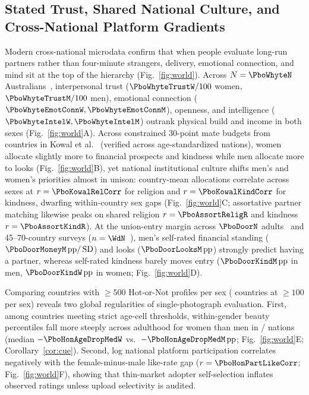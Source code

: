\subsection{Stated Trust, Shared National Culture, and Cross-National Platform Gradients}
Modern cross-national microdata confirm that when people evaluate long-run partners rather than four-minute strangers, delivery, emotional connection, and mind sit at the top of the hierarchy (Fig.~\ref{fig:world}). Across $N=\PboWhyteN$ Australians~\cite{whyte2021}, interpersonal trust ($\PboWhyteTrustW/100$ women, $\PboWhyteTrustM/100$ men), emotional connection ($\PboWhyteEmotConnW,\PboWhyteEmotConnM$), openness, and intelligence ($\PboWhyteIntelW,\PboWhyteIntelM$) outrank physical build and income in both sexes (Fig.~\ref{fig:world}A). Across \PboKowalBudgetN{} constrained 30-point mate budgets from \PboKowalCountryN{} countries in Kowal et al.~\cite{kowal2025} (verified across \PboKowalStdCountryN{} age-standardized nations), women allocate slightly more to financial prospects and kindness while men allocate more to looks (Fig.~\ref{fig:world}B), yet national institutional culture shifts men's and women's priorities almost in unison: country-mean allocations correlate across sexes at $r=\PboKowalRelCorr$ for religion and $r=\PboKowalKindCorr$ for kindness, dwarfing within-country sex gaps (Fig.~\ref{fig:world}C; assortative partner matching likewise peaks on shared religion $r=\PboAssortReligR$ and kindness $r=\PboAssortKindR$). At the union-entry margin across $\PboDoorN$ adults~\cite{kowal2025} and 45--70-country surveys ($n=\WdN$~\cite{walter2020}), men's self-rated financial standing ($\PboDoorMoneyM\,\mathrm{pp}/\SD$) and looks ($\PboDoorLooksM\,\mathrm{pp}$) strongly predict having a partner, whereas self-rated kindness barely moves entry ($\PboDoorKindM\,\mathrm{pp}$ in men, $\PboDoorKindW\,\mathrm{pp}$ in women; Fig.~\ref{fig:world}D).

Comparing \PboHonCountriesFiveHundred{} countries with $\ge 500$ Hot-or-Not profiles per sex (\PboHonCountriesHundred{} countries at $\ge 100$ per sex) reveals two global regularities of single-photograph evaluation. First, among \PboHonCountriesStrictAge{} countries meeting strict age-cell thresholds, within-gender beauty percentiles fall more steeply across adulthood for women than men in \PboHonFemaleSteeperCountries/\PboHonCountriesStrictAge{} nations (median $-\PboHonAgeDropMedW$ vs.\ $-\PboHonAgeDropMedM\,\mathrm{pp}$; Fig.~\ref{fig:world}E; Corollary~\ref{cor:cue}). Second, log national platform participation correlates negatively with the female-minus-male like-rate gap ($r=\PboHonPartLikeCorr$; Fig.~\ref{fig:world}F), showing that thin-market adopter self-selection inflates observed ratings unless upload selectivity is audited.

